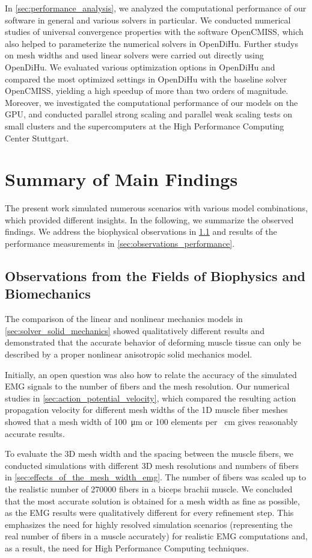 In \cref{sec:performance_analysis}, we analyzed the computational performance of our software in general and various solvers in particular. We conducted numerical studies of universal convergence properties with the software OpenCMISS, which also helped to parameterize the numerical solvers in OpenDiHu. Further studys on mesh widths and used linear solvers were carried out directly using OpenDiHu. We evaluated various optimization options in OpenDiHu and compared the most optimized settings in OpenDiHu with the baseline solver OpenCMISS, yielding a high speedup of more than two orders of magnitude. Moreover, we investigated the computational performance of our models on the GPU, and conducted parallel strong scaling and parallel weak scaling tests on small clusters and the supercomputers at the High Performance Computing Center Stuttgart.

\section{Summary of Main Findings}

The present work simulated numerous scenarios with various model combinations, which provided different insights. In the following, we summarize the observed findings. We address the biophysical observations in \cref{sec:observations_biophysics} and results of the performance measurements in \cref{sec:observations_performance}.

\subsection{Observations from the Fields of Biophysics and Biomechanics}\label{sec:observations_biophysics}
The comparison of the linear and nonlinear mechanics models in \cref{sec:solver_solid_mechanics} showed qualitatively different results and demonstrated that the accurate behavior of deforming muscle tissue can only be described by a proper nonlinear anisotropic solid mechanics model. 

Initially, an open question was also how to relate the accuracy of the simulated EMG signals to the number of fibers and the mesh resolution. Our numerical studies in \cref{sec:action_potential_velocity}, which compared the resulting action propagation velocity for different mesh widths of the 1D muscle fiber meshes showed that a mesh width of \SI{100}{\micro\meter} or 100 elements per \SI{}{\centi\meter} gives reasonably accurate results. 

To evaluate the 3D mesh width and the spacing between the muscle fibers, we conducted simulations with different 3D mesh resolutions and numbers of fibers in \cref{sec:effects_of_the_mesh_width_emg}. The number of fibers was scaled up to the realistic number of \num{270000} fibers in a biceps brachii muscle. We concluded that the most accurate solution is obtained for a mesh width as fine as possible, as the EMG results were qualitatively different for every refinement step. This emphasizes the need for highly resolved simulation scenarios (representing the real number of fibers in a muscle accurately) for realistic EMG computations and, as a result, the need for High Performance Computing techniques.

